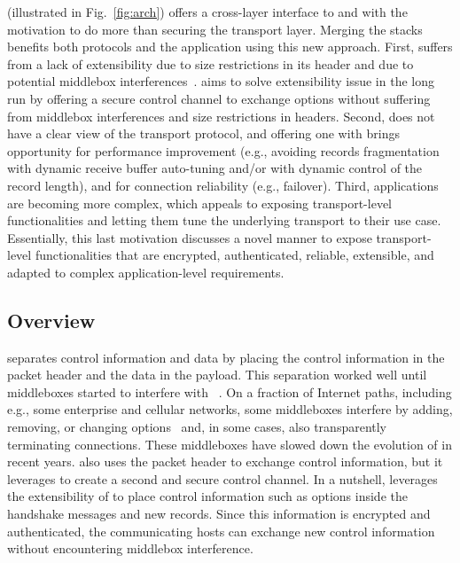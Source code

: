 \tcpls (illustrated in Fig.~\ref{fig:arch}) offers a cross-layer interface to \tls and \tcp with the motivation to do more than securing the transport layer. Merging the stacks benefits both protocols and the application using this new approach. First, \tcp suffers from a lack of extensibility due to size restrictions in its header and due to potential middlebox interferences~\cite{honda2011still}. \tcpls aims to solve \tcp extensibility issue in the long run by offering a secure control channel to exchange \tcp options without suffering from middlebox interferences and size restrictions in \tcp headers. Second, \tls does not have a clear view of the transport protocol, and offering one with \tcpls brings opportunity for performance improvement (e.g., avoiding records fragmentation with dynamic receive buffer auto-tuning and/or with dynamic control of the record length), and for connection reliability (e.g., failover).  Third, applications are becoming more complex, which appeals to exposing transport-level functionalities and letting them tune the underlying transport to their use case. Essentially, this last motivation discusses a novel manner to expose transport-level functionalities that are encrypted, authenticated, reliable, extensible, and adapted to complex application-level requirements.

\subsection{Overview}

\tcp separates control information and data by placing the control information
in the packet header and the data in the payload. This separation worked well
until middleboxes started to interfere with \tcp~\cite{10.1145/1064413.1064418,
  honda2011still, DHBVD13}.  On a fraction of Internet paths, including e.g.,
some enterprise and cellular networks, some middleboxes interfere by adding,
removing, or changing \tcp options~\cite{wang2011untold, honda2011still,
  xu2015investigating} and, in some cases, also transparently terminating \tcp
connections. These middleboxes have slowed down the evolution of \tcp in recent
years. \tcpls also uses the packet header to exchange \tcp control information,
but it leverages \tls to create a second and secure control channel. In a
nutshell, \tcpls leverages the extensibility of  to place control
information such as \tcp options inside the \tls handshake messages and new \tls
records. Since this information is encrypted and authenticated, the
communicating hosts can exchange new control information without encountering
middlebox interference.


